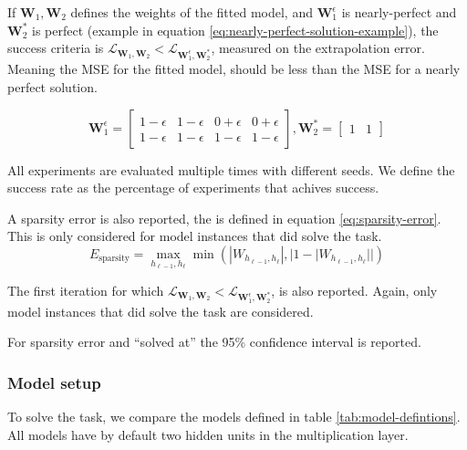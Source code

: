 If $\mathbf{W}_1, \mathbf{W}_2$ defines the weights of the fitted model, and $\mathbf{W}_1^\epsilon$ is nearly-perfect and $\mathbf{W}_2^*$ is perfect (example in equation \ref{eq:nearly-perfect-solution-example}), the success criteria is $\mathcal{L}_{\mathbf{W}_1, \mathbf{W}_2} < \mathcal{L}_{\mathbf{W}_1^\epsilon, \mathbf{W}_2^*}$, measured on the extrapolation error. Meaning the MSE for the fitted model, should be less than the MSE for a nearly perfect solution.

\begin{equation}
    \mathbf{W}_1^\epsilon = \begin{bmatrix}
    1 - \epsilon & 1 - \epsilon & 0 + \epsilon & 0 + \epsilon \\
    1 - \epsilon & 1 - \epsilon & 1 - \epsilon & 1 - \epsilon
    \end{bmatrix}, \mathbf{W}_2^* = \begin{bmatrix}
    1 & 1
    \end{bmatrix}
    \label{eq:nearly-perfect-solution-example}
\end{equation}

All experiments are evaluated multiple times with different seeds. We define the success rate as the percentage of experiments that achives success.

A sparsity error is also reported, the is defined in equation \ref{eq:sparsity-error}. This is only considered for model instances that did solve the task.
\begin{equation}
E_\mathrm{sparsity} = \max_{h_{\ell-1}, h_{\ell}} \min(|W_{h_{\ell-1},h_\ell}|, |1 - |W_{h_{\ell-1},h_\ell}||)
\label{eq:sparsity-error}
\end{equation}

The first iteration for which $\mathcal{L}_{\mathbf{W}_1, \mathbf{W}_2} < \mathcal{L}_{\mathbf{W}_1^\epsilon, \mathbf{W}_2^*}$, is also reported. Again, only model instances that did solve the task are considered.

For sparsity error and ``solved at'' the 95\% confidence interval is reported.

\subsubsection{Model setup}

To solve the task, we compare the models defined in table \ref{tab:model-defintions}. All models have by default two hidden units in the multiplication layer.


